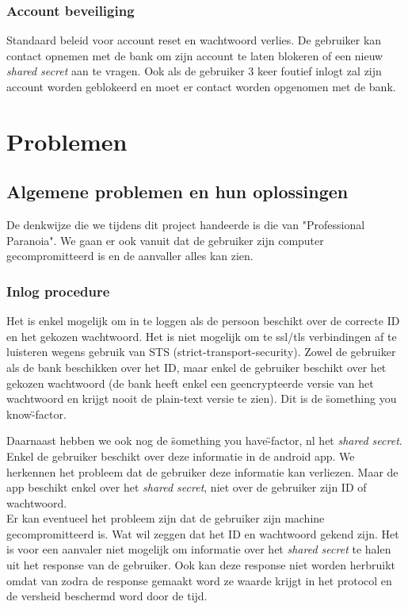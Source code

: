 \documentclass[11pt]{article}
\begin{document}
\subsubsection{Account beveiliging}
\label{sec:bev}
Standaard beleid voor account reset en wachtwoord verlies. De gebruiker kan contact opnemen met de bank om zijn account te laten blokeren of een nieuw \emph{shared secret} aan te vragen. Ook als de gebruiker 3 keer foutief inlogt zal zijn account worden geblokeerd en moet er contact worden opgenomen met de bank.
\section{Problemen}
\subsection{Algemene problemen en hun oplossingen}
De denkwijze die we tijdens dit project handeerde is die van "Professional Paranoia". We gaan er ook vanuit dat de gebruiker zijn computer gecompromitteerd is en de aanvaller alles kan zien.

\subsubsection{Inlog procedure}
Het is enkel mogelijk om in te loggen als de persoon beschikt over de correcte ID en het gekozen wachtwoord. Het is niet mogelijk om te ssl/tls verbindingen af te luisteren wegens gebruik van STS (strict-transport-security). Zowel de gebruiker als de bank beschikken over het ID, maar enkel de gebruiker beschikt over het gekozen wachtwoord (de bank heeft enkel een geencrypteerde versie van het wachtwoord en krijgt nooit de plain-text versie te zien). Dit is de \"something you know\"-factor.

Daarnaast hebben we ook nog de \"something you have\"-factor, nl het \emph{shared secret}. Enkel de gebruiker beschikt over deze informatie in de android app. We herkennen het probleem dat de gebruiker deze informatie kan verliezen. Maar de app beschikt enkel over het \emph{shared secret}, niet over de gebruiker zijn ID of wachtwoord.\\

Er kan eventueel het probleem zijn dat de gebruiker zijn machine gecompromitteerd is. Wat wil zeggen dat het ID en wachtwoord gekend zijn. Het is voor een aanvaler niet mogelijk om informatie over het \emph{shared secret} te halen uit het response van de gebruiker. Ook kan deze response niet worden herbruikt omdat van zodra de response gemaakt word ze waarde krijgt in het protocol en de versheid beschermd word door de tijd.
\end{document}
